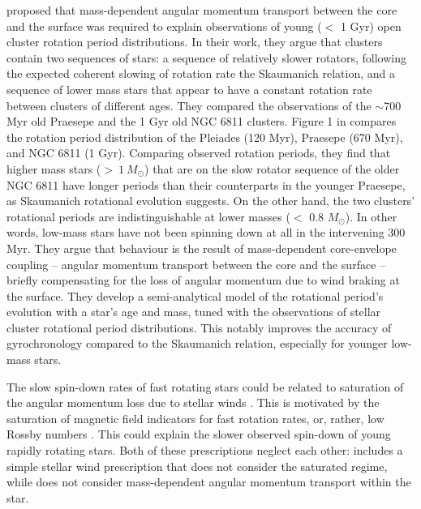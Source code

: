 \citet{spada_competing_2020} proposed that mass-dependent angular momentum transport between the core and the surface was required to explain observations of young ($<$ 1 Gyr) open cluster rotation period distributions.
In their work, they argue that clusters contain two sequences of stars: a sequence of relatively slower rotators, following the expected coherent slowing of rotation rate  the Skaumanich relation, and a sequence of lower mass stars that appear to have a constant rotation rate between clusters of different ages.
They compared the observations of the $\sim$700 Myr old Praesepe and the 1 Gyr old NGC 6811 clusters.
Figure 1 in \citet{spada_competing_2020} compares the rotation period distribution of the Pleiades (120 Myr), Praesepe (670 Myr), and NGC 6811 (1 Gyr).
Comparing observed rotation periods, they find that higher mass stars (${>\ 1 \ M_{\odot}}$) that are on the slow rotator sequence of the older NGC 6811 have longer periods than their counterparts in the younger Praesepe, as Skaumanich rotational evolution suggests.
On the other hand, the two clusters' rotational periods are indistinguishable at lower masses ($<$ 0.8 $M_{\odot}$).
In other words, low-mass stars have not been spinning down at all in the intervening 300 Myr. 
They argue that behaviour is the result of mass-dependent core-envelope coupling -- angular momentum transport between the core and the surface -- briefly compensating for the loss of angular momentum due to wind braking at the surface.
They develop a semi-analytical model of the rotational period's evolution with a star's age and mass, tuned with the observations of stellar cluster rotational period distributions.
This notably improves the accuracy of gyrochronology compared to the Skaumanich relation, especially for younger low-mass stars.

The slow spin-down rates of fast rotating stars could  be related to saturation of the angular momentum loss due to stellar winds \citep{johnstone_stellar_2015, johnstone_stellar_2015-1,gallet_improved_2013}.
This is motivated by the saturation of magnetic field indicators for fast rotation rates, or, rather, low Rossby numbers \citep{wright_stellar-activity-rotation_2011}.
This could explain the slower observed spin-down of young rapidly rotating stars.
Both of these prescriptions neglect each other: \citet{spada_competing_2020} includes a simple stellar wind prescription that does not consider the saturated regime, while \citet{gallet_improved_2013} does not consider mass-dependent angular momentum transport within the star.

